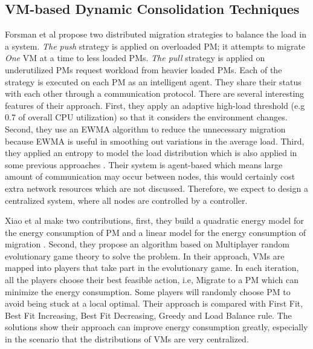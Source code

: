 \subsection{VM-based Dynamic Consolidation Techniques}
\label{sec:dynamic}

Forsman et al \cite{Forsman:2015ca} propose two distributed migration strategies to balance the load in a system. \emph{The push} strategy is applied on overloaded PM; it attempts to migrate \emph{One} VM at a time to less loaded PMs. \emph{The pull} strategy is applied on underutilized PMs request workload from heavier loaded PMs. Each of the strategy is executed on each PM as an intelligent agent. They share their status with each other through a communication protocol. There are several interesting features of their approach. First, they apply an adaptive high-load threshold (e.g 0.7 of overall CPU utilization) so that it considers the environment changes. Second, they use an EWMA algorithm to reduce the unnecessary migration because EWMA \cite{Holt:2004fs} is useful in smoothing out variations in the average load. Third, they applied an entropy to model the load distribution which is also applied in some previous approaches \cite{Qin:2012wu,Kunkle:2008bz}. Their system is agent-based which means large amount of communication may occur between nodes, this would certainly cost extra network resources which are not discussed. Therefore, we expect to design a centralized system, where all nodes are controlled by a controller. 

Xiao et al \cite{Xiao:2015ik} make two contributions, first, they build a quadratic energy model for the energy consumption of PM and a linear model for the energy consumption of migration \cite{Liu:2013kl}. Second, they propose an algorithm based on Multiplayer random evolutionary game theory to solve the problem. In their approach, VMs are mapped into players that take part in the evolutionary game. In each iteration, all the players choose their best feasible action, i.e, Migrate to a PM which can minimize the energy consumption. Some players will randomly choose PM to avoid being stuck at a local optimal. Their approach is compared with First Fit, Best Fit Increasing, Best Fit Decreasing, Greedy and Load Balance rule. The solutions show their approach can improve energy consumption greatly, especially in the scenario that the distributions of VMs are very centralized.






